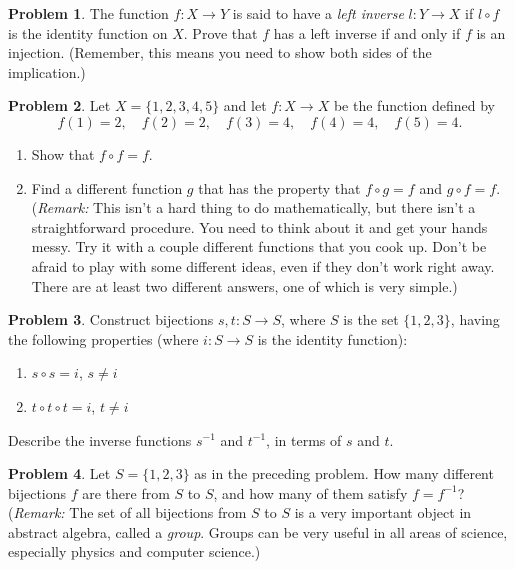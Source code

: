 \documentclass{article}
\numberwithin{equation}{section}
\theoremstyle{plain}
\theoremstyle{definition}
\newtheorem{problem}{Problem}
\begin{document}
\begin{problem}
	The function $ f : X \to Y$ is said to have a \emph{left inverse} $l : Y \to X$ if $l \circ f$ is the identity function on $X$. Prove that $f$ has a left inverse if and only if $f$ is an injection. (Remember, this means you need to show both sides of the implication.) 
\end{problem}

\begin{problem}
	Let $X = \{1,2,3,4,5\}$ and let $f : X \to X$ be the function defined by 
	\[
	f(1) = 2, \quad f(2) = 2, \quad f(3) = 4, \quad f(4) = 4, \quad f(5) = 4.
	\]
	\begin{enumerate}[label=(\alph*)]
		\item Show that $f \circ f = f$. 
		\item Find a different function $g$ that has the property that $f \circ g = f$ and $g \circ f = f$. (\emph{Remark:} This isn't a hard thing to do mathematically, but there isn't a straightforward procedure. You need to think about it and get your hands messy. Try it with a couple different functions that you cook up. Don't be afraid to play with some different ideas, even if they don't work right away. There are at least two different answers, one of which is very simple.)
	\end{enumerate}
\end{problem}

\begin{problem}
	Construct bijections $s, t : S \to S$, where $S$ is the set $\{1,2,3\}$, having the following properties (where $i : S \to S$ is the identity function): 
	\begin{enumerate}[label=(\alph*)]
	\item $s \circ s = i$, $s \neq i$
	\item $t\circ t \circ t = i$, $t \neq i$
\end{enumerate}
Describe the inverse functions $s^{-1}$ and $t^{-1}$, in terms of $s$ and $t$. 
\end{problem}

\begin{problem}
	Let $S = \{1,2,3\}$ as in the preceding problem. How many different bijections $f$ are there from $S$ to $S$, and how many of them satisfy $f = f^{-1}$? (\emph{Remark:} The set of all bijections from $S$ to $S$ is a very important object in abstract algebra, called a \emph{group}. Groups can be very useful in all areas of science, especially physics and computer science.)
\end{problem}
\end{document}
